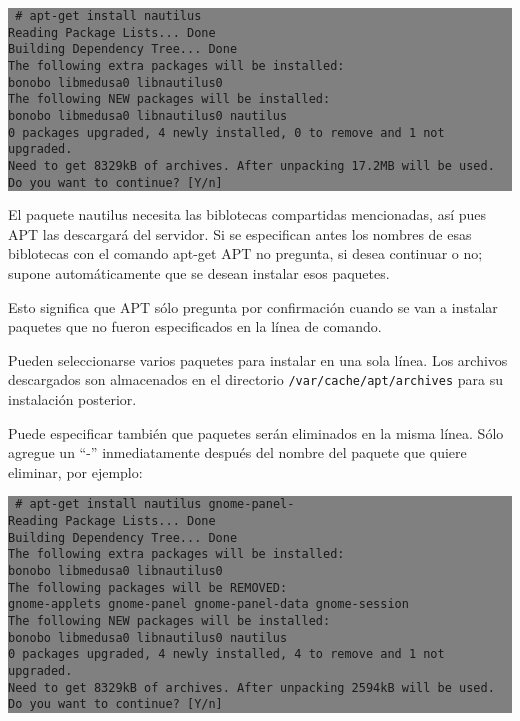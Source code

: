 \documentclass[12pt]{article}
\begin{document}
\colorbox{grey}{\parbox[t]{0.95\linewidth}{ \vspace*{0.5cm} {\tt
     \# apt-get install nautilus \\ 
     Reading Package Lists... Done \\
     Building Dependency Tree... Done\\
     The following extra packages will be installed:\\
       bonobo libmedusa0 libnautilus0\\
     The following NEW packages will be installed:\\
       bonobo libmedusa0 libnautilus0 nautilus\\
     0 packages upgraded, 4 newly installed, 0 to remove and 1 not upgraded.\\
     Need to get 8329kB of archives. After unpacking 17.2MB will be used.\\
     Do you want to continue? [Y/n]\\
 } \vspace*{0.5cm} } } 

El paquete nautilus necesita las biblotecas compartidas mencionadas, así pues APT las descargará del servidor. Si se especifican antes los nombres de esas biblotecas con el comando apt-get APT no pregunta, si desea continuar o no; supone automáticamente que se desean instalar esos paquetes.

Esto significa que APT sólo pregunta por confirmación cuando se van a instalar paquetes que no fueron especificados en la línea de comando.

Pueden seleccionarse varios paquetes para instalar en una sola línea. Los archivos descargados son almacenados en el directorio \texttt{/var/cache/apt/archives} para su instalación posterior.

Puede especificar también que paquetes serán eliminados en la misma línea. Sólo agregue un ``-'' inmediatamente después del nombre del paquete que quiere eliminar, por ejemplo:

\colorbox{grey}{\parbox[t]{0.95\linewidth}{ \vspace*{0.5cm} {\tt
     \# apt-get install nautilus gnome-panel-\\
     Reading Package Lists... Done\\
     Building Dependency Tree... Done\\
     The following extra packages will be installed:\\
       bonobo libmedusa0 libnautilus0\\
     The following packages will be REMOVED:\\
       gnome-applets gnome-panel gnome-panel-data gnome-session\\
     The following NEW packages will be installed:\\
       bonobo libmedusa0 libnautilus0 nautilus\\
     0 packages upgraded, 4 newly installed, 4 to remove and 1 not upgraded.\\
     Need to get 8329kB of archives. After unpacking 2594kB will be used.\\
     Do you want to continue? [Y/n]\\
 } \vspace*{0.5cm} } } 
\end{document}
